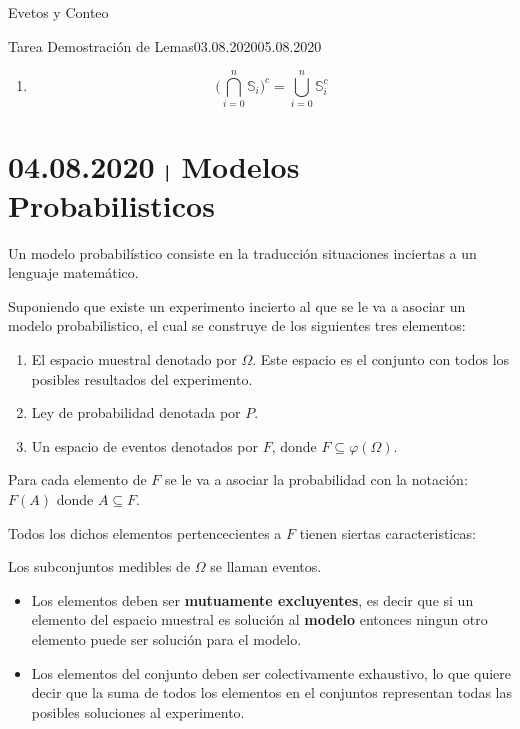\documentclass[a4paper]{book}
\begin{document}
\begin{chapter}{Evetos y Conteo}
\begin{tarea}{Tarea Demostración de Lemas}{03.08.2020}{05.08.2020}
\begin{enumerate}
\begin{description}
                    \end{description}

                \item \[\Big(\bigcap_{i=0}^{n}\mathbb S_i\Big)^{c} =
                    \bigcup_{i=0}^{n}\mathbb S_{i}^{c}\]
            \end{enumerate}
    \end{tarea}

    \section{04.08.2020 $\mybar$ Modelos Probabilisticos}
    \label{sec:modelos_probabilisticos}

    Un modelo probabilístico consiste en la traducción situaciones inciertas a
    un lenguaje matemático.

    Suponiendo que existe un experimento incierto al que se le va a asociar un
    modelo probabilistico, el cual se construye de los siguientes tres
    elementos:

    \begin{enumerate}[{1. }]
        \item El espacio muestral denotado por $\Omega$. Este espacio es el
            conjunto con todos los posibles resultados del experimento.

        \item Ley de probabilidad denotada por $P$.

        \item Un espacio de eventos denotados por $F$, donde $F\subseteq
            \varphi\left(\Omega\right)$.
    \end{enumerate}

    Para cada elemento de $F$ se le va a asociar la probabilidad con la
    notación: $F\left(A\right)$ donde $A\subseteq F$.

    Todos los dichos elementos pertencecientes a $F$ tienen siertas
    caracteristicas:

    \begin{obs}
        Los subconjuntos medibles de $\Omega$ se llaman eventos.
    \end{obs}

    \begin{itemize}
        \item Los elementos deben ser \textbf{mutuamente excluyentes}, es decir
            que si un elemento del espacio muestral es solución al
            \textbf{modelo} entonces ningun otro elemento puede ser solución
            para el modelo.
        \item Los elementos del conjunto deben ser colectivamente exhaustivo,
            lo que quiere decir que la suma de todos los elementos en el
            conjuntos representan todas las posibles soluciones al experimento.
    \end{itemize}


\end{chapter}
\end{document}
